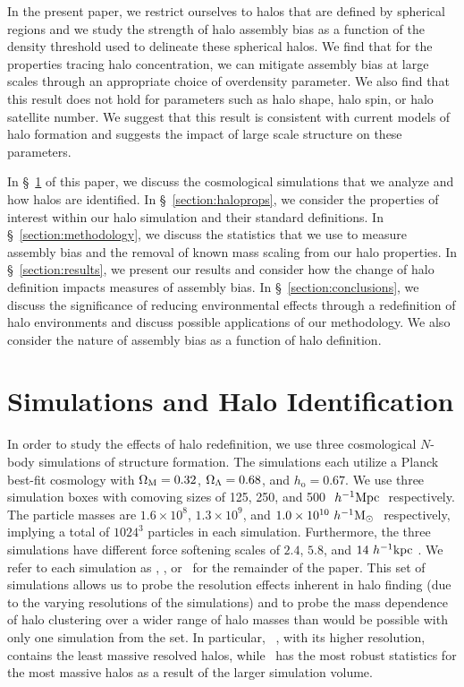 \documentclass[usenatbib]{mnras}
\begin{document}
In the present paper, we restrict ourselves to halos that are defined by spherical regions and we 
study the strength of halo assembly bias as a function of the density threshold used to delineate these 
spherical halos. We find that for the properties tracing halo concentration, we can mitigate assembly bias at large scales through an appropriate choice of overdensity parameter. We also find that this result does not hold for parameters such as halo shape, halo spin, or halo satellite number. We suggest that this result is consistent with current models of halo formation and suggests the impact of large scale structure on these parameters.

 
In \S~\ref{section:data} of this paper, we discuss the cosmological simulations that we analyze and how halos are
identified. In \S~\ref{section:haloprops}, we consider the properties of interest within our halo simulation and
their standard definitions. In \S~\ref{section:methodology}, we discuss the statistics that we use to measure
assembly bias and the removal of known mass scaling from our halo properties. In \S~\ref{section:results}, we
present our results and consider how the change of halo definition impacts measures of assembly bias. In
\S~\ref{section:conclusions}, we discuss the significance of reducing environmental effects through a
redefinition of halo environments and discuss possible applications of our methodology. We also consider the
nature of assembly bias as a function of halo definition.





\section[]{Simulations and Halo Identification}
\label{section:data}

In order to study the effects of halo redefinition, we use three cosmological $N$-body simulations of structure
formation. The \citet{diemer_kravtsov15} simulations each utilize a Planck best-fit cosmology with $\Omega_{\mathrm{M}} = 0.32$, $\Omega_{\Lambda} =
0.68$, and $h_{\mathrm{o}} = 0.67$. We use three simulation boxes with comoving sizes of 125, 250, and 500
$\ h^{-1}\mathrm{Mpc}~$ respectively. The particle masses are $1.6 \times 10^8$, $1.3 \times 10^9$, and $1.0 \times 10^{10}
\ h^{-1}\mathrm{M}_{\odot}~$ respectively, implying a total of $1024^3$ particles in each simulation. Furthermore, the three
simulations have different force softening scales of $2.4$, $5.8$, and $14 \ h^{-1}\mathrm{kpc}~$. We refer to each simulation as
\simA, \simB, or \simC  \ for the remainder of the paper. This set of simulations allows us to probe the
resolution effects inherent in halo finding (due to the varying resolutions of the simulations) and to probe the
mass dependence of halo clustering over a wider range of halo masses than would be possible with only one
simulation from the set. In particular, \simA~, with its higher resolution, contains the least massive resolved
halos, while \simC~has the most robust statistics for the most massive halos as a result of the larger simulation
volume.
\end{document}
